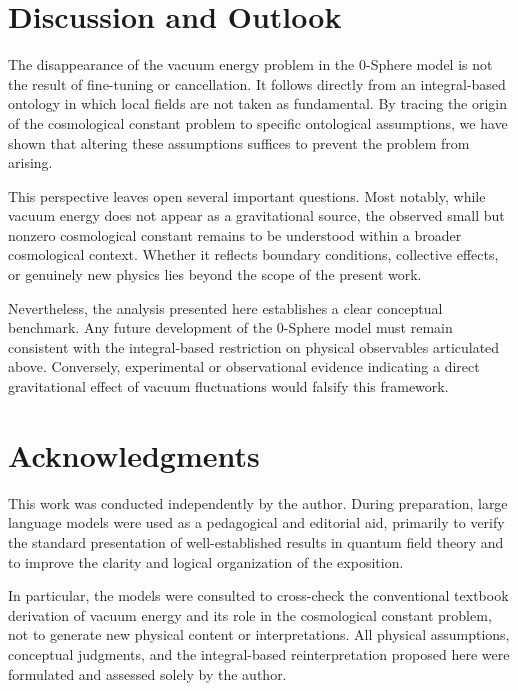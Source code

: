 \documentclass[%
 reprint,
 amsmath,amssymb,
 aps,
 prb,
]{revtex4-2}
\numberwithin{equation}{section}
\begin{document}
\clearpage

\section{Discussion and Outlook}
\label{sec:discussion}

The disappearance of the vacuum energy problem in the 0-Sphere model is not the result of fine-tuning or cancellation. It follows directly from an integral-based ontology in which local fields are not taken as fundamental. By tracing the origin of the cosmological constant problem to specific ontological assumptions, we have shown that altering these assumptions suffices to prevent the problem from arising.

This perspective leaves open several important questions. Most notably, while vacuum energy does not appear as a gravitational source, the observed small but nonzero cosmological constant remains to be understood within a broader cosmological context. Whether it reflects boundary conditions, collective effects, or genuinely new physics lies beyond the scope of the present work.

Nevertheless, the analysis presented here establishes a clear conceptual benchmark. Any future development of the 0-Sphere model must remain consistent with the integral-based restriction on physical observables articulated above. Conversely, experimental or observational evidence indicating a direct gravitational effect of vacuum fluctuations would falsify this framework.


\section*{Acknowledgments}

This work was conducted independently by the author. During preparation, large language models were used as a pedagogical and editorial aid, primarily to verify the standard presentation of well-established results in quantum field theory and to improve the clarity and logical organization of the exposition. 

In particular, the models were consulted to cross-check the conventional textbook derivation of vacuum energy and its role in the cosmological constant problem, not 
to generate new physical content or interpretations. All physical assumptions, conceptual judgments, and the integral-based reinterpretation proposed here were formulated and assessed solely by the author.
\end{document}
